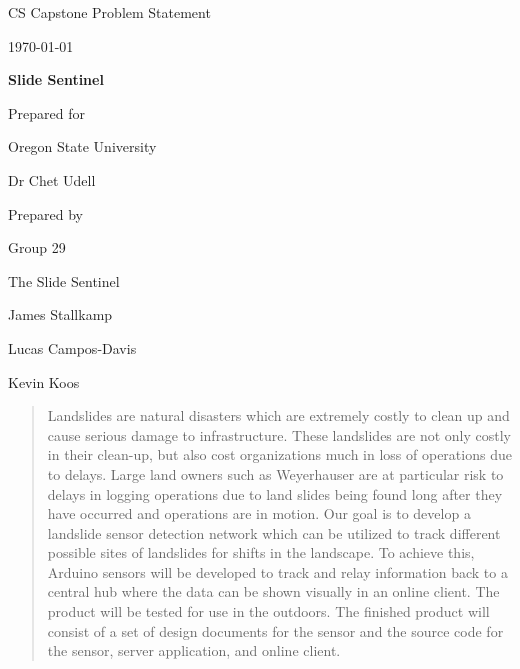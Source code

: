\documentclass[onecolumn, draftclsnofoot,10pt, compsoc]{IEEEtran}
\def \CapstoneTeamName{		        The Slide Sentinel}
\def \CapstoneTeamNumber{		    29}
\def \GroupMemberOne{			    James Stallkamp}
\def \GroupMemberTwo{			    Lucas Campos-Davis}
\def \GroupMemberThree{			    Kevin Koos}
\def \CapstoneProjectName{		    Slide Sentinel}
\def \CapstoneSponsorCompany{	    Oregon State University}
\def \CapstoneSponsorPerson{		Dr Chet Udell}
\def \DocType{	Problem Statement
				}
\newcommand{\NameSigPair}[1]{\par
\makebox[2.75in][r]{#1} \hfil 	\makebox[3.25in]{\makebox[2.25in]{\hrulefill} \hfill		\makebox[.75in]{\hrulefill}}
\par\vspace{-12pt} \textit{\tiny\noindent
\makebox[2.75in]{} \hfil		\makebox[3.25in]{\makebox[2.25in][r]{Signature} \hfill	\makebox[.75in][r]{Date}}}}
\renewcommand{\NameSigPair}[1]{#1}
\begin{document}
\begin{titlepage}
    \begin{singlespace}
        \hfill 
        \par\vspace{.2in}
        \centering
        \scshape{
            \huge CS Capstone \DocType \par
            {\large\today}\par
            \vspace{.5in}
            \textbf{\Huge\CapstoneProjectName}\par
            \vfill
            {\large Prepared for}\par
            \Huge \CapstoneSponsorCompany\par
            \vspace{5pt}
            {\Large\NameSigPair{\CapstoneSponsorPerson}\par}
            {\large Prepared by }\par
            Group\CapstoneTeamNumber\par
            \CapstoneTeamName\par 
            \vspace{5pt}
            {\Large
                \NameSigPair{\GroupMemberOne}\par
                \NameSigPair{\GroupMemberTwo}\par
                \NameSigPair{\GroupMemberThree}\par
            }
            \vspace{20pt}
        }
        \begin{abstract}
        	Landslides are natural disasters which are extremely costly to clean up and cause serious damage to infrastructure. These landslides are not only costly in their clean-up, but also cost organizations much in loss of operations due to delays. Large land owners such as Weyerhauser are at particular risk to delays in logging operations due to land slides being found long after they have occurred and operations are in motion. Our goal is to develop a landslide sensor detection network which can be utilized to track different possible sites of landslides for shifts in the landscape. To achieve this, Arduino sensors will be developed to track and relay information back to a central hub where the data can be shown visually in an online client. The product will be tested for use in the outdoors. The finished product will consist of a set of design documents for the sensor and the source code for the sensor, server application, and online client.
        \end{abstract}     
    \end{singlespace}
\end{titlepage}
\end{document}
